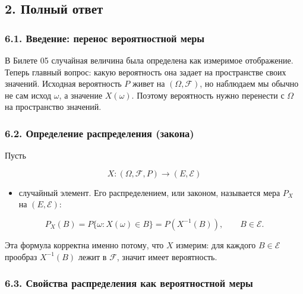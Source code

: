 \documentclass[
  11pt,
  a4paper,
]{article}
\providecommand{\tightlist}{%
  \setlength{\itemsep}{0pt}\setlength{\parskip}{0pt}}
\begin{document}
\subsection{2. Полный
ответ}\label{ux43fux43eux43bux43dux44bux439-ux43eux442ux432ux435ux442}

\subsubsection{6.1. Введение: перенос вероятностной
меры}\label{ux432ux432ux435ux434ux435ux43dux438ux435-ux43fux435ux440ux435ux43dux43eux441-ux432ux435ux440ux43eux44fux442ux43dux43eux441ux442ux43dux43eux439-ux43cux435ux440ux44b}

В Билете 05 случайная величина была определена как измеримое
отображение. Теперь главный вопрос: какую вероятность она задает на
пространстве своих значений. Исходная вероятность \(P\) живет на
\((\Omega,\mathcal F)\), но наблюдаем мы обычно не сам исход \(\omega\),
а значение \(X(\omega)\). Поэтому вероятность нужно перенести с
\(\Omega\) на пространство значений.

\subsubsection{6.2. Определение распределения
(закона)}\label{ux43eux43fux440ux435ux434ux435ux43bux435ux43dux438ux435-ux440ux430ux441ux43fux440ux435ux434ux435ux43bux435ux43dux438ux44f-ux437ux430ux43aux43eux43dux430}

Пусть

\[
X:(\Omega,\mathcal F,P)\to(E,\mathcal E)
\]

\begin{itemize}
\tightlist
\item
  случайный элемент. Его распределением, или законом, называется мера
  \(P_X\) на \((E,\mathcal E)\):
\end{itemize}

\[
P_X(B)=P\{\omega:X(\omega)\in B\}=P(X^{-1}(B)),\qquad B\in\mathcal E.
\]

Эта формула корректна именно потому, что \(X\) измерим: для каждого
\(B\in\mathcal E\) прообраз \(X^{-1}(B)\) лежит в \(\mathcal F\), значит
имеет вероятность.

\subsubsection{6.3. Свойства распределения как вероятностной
меры}\label{ux441ux432ux43eux439ux441ux442ux432ux430-ux440ux430ux441ux43fux440ux435ux434ux435ux43bux435ux43dux438ux44f-ux43aux430ux43a-ux432ux435ux440ux43eux44fux442ux43dux43eux441ux442ux43dux43eux439-ux43cux435ux440ux44b}
\end{document}
